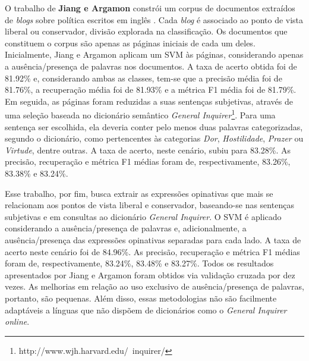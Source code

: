 O trabalho de \textbf{Jiang e Argamon} constrói um corpus de documentos extraídos de \emph{blogs} sobre política escritos em inglês \cite{jiang-argamon}. Cada \emph{blog} é associado ao ponto de vista liberal ou conservador, divisão explorada na classificação. Os documentos que constituem o corpus são apenas as páginas iniciais de cada um deles. Inicialmente, Jiang e Argamon aplicam um SVM às páginas, considerando apenas a ausência/presença de palavras nos documentos. A taxa de acerto obtida foi de 81.92\% e, considerando ambas as classes, tem-se que a precisão média foi de 81.76\%, a recuperação média foi de 81.93\% e a métrica F1 média foi de 81.79\%. Em seguida, as páginas foram reduzidas a suas sentenças subjetivas, através de uma seleção baseada no dicionário semântico \emph{General Inquirer}\footnote{http://www.wjh.harvard.edu/~inquirer/}. Para uma sentença ser escolhida, ela deveria conter pelo menos duas palavras categorizadas, segundo o dicionário, como pertencentes às categorias \emph{Dor}, \emph{Hostilidade}, \emph{Prazer} ou \emph{Virtude}, dentre outras. A taxa de acerto, neste cenário, subiu para 83.28\%. As precisão, recuperação e métrica F1 médias foram de, respectivamente, 83.26\%, 83.38\% e 83.24\%. 

Esse trabalho, por fim, busca extrair as expressões opinativas que mais se relacionam aos pontos de vista liberal e conservador, baseando-se nas sentenças subjetivas e em consultas ao dicionário \emph{General Inquirer}. O SVM é aplicado considerando a ausência/presença de palavras e, adicionalmente, a ausência/presença das expressões opinativas separadas para cada lado. A taxa de acerto neste cenário foi de 84.96\%. As precisão, recuperação e métrica F1 médias foram de, respectivamente, 83.24\%, 83.48\% e 83.27\%. Todos os resultados apresentados por Jiang e Argamon foram obtidos via validação cruzada por dez vezes. As melhorias em relação ao uso exclusivo de ausência/presença de palavras, portanto, são pequenas. Além disso, essas metodologias não são facilmente adaptáveis a línguas que não dispõem de dicionários como o \emph{General Inquirer} \emph{online}.



